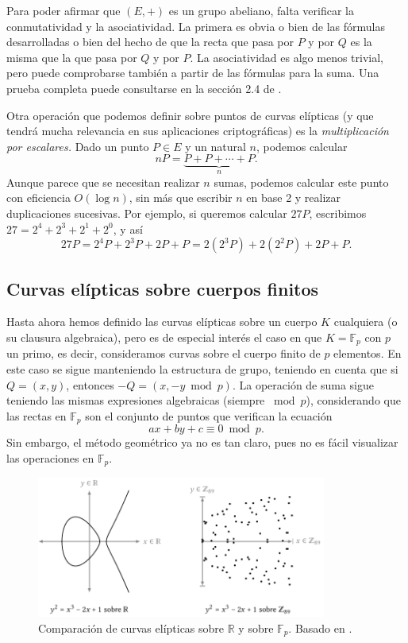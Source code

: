 \documentclass[
  a4paper,
  12pt,
  spanish,
]{scrartcl}
\begin{document}
    Para poder afirmar que $(E, +)$ es un grupo abeliano, falta verificar la conmutatividad y la asociatividad. La primera es obvia o bien de las fórmulas desarrolladas o bien del hecho de que la recta que pasa por $P$ y por $Q$ es la misma que la que pasa por $Q$ y por $P$. La asociatividad es algo menos trivial, pero puede comprobarse también a partir de las fórmulas para la suma. Una prueba completa puede consultarse en la sección 2.4 de \parencite{elliptic_washington_2008}.
    
    Otra operación que podemos definir sobre puntos de curvas elípticas (y que tendrá mucha relevancia en sus aplicaciones criptográficas) es la \textit{multiplicación por escalares.} Dado un punto $P\in E$ y un natural $n$, podemos calcular \[ nP = \underbrace{P + P + \cdots + P}_{n}.\] Aunque parece que se necesitan realizar $n$ sumas, podemos calcular este punto con eficiencia $O(\log n)$, sin más que escribir $n$ en base 2 y realizar duplicaciones sucesivas. Por ejemplo, si queremos calcular $27P$, escribimos $27 = 2^4 + 2^3 + 2^1 + 2^0$, y así \[ 27P = 2^4P + 2^3P + 2P + P = 2(2^3P) + 2(2^2P) + 2P + P.\]
    
\subsection{Curvas elípticas sobre cuerpos finitos}

Hasta ahora hemos definido las curvas elípticas sobre un cuerpo $K$ cualquiera (o su clausura algebraica), pero es de especial interés el caso en que $K=\mathbb{F}_p$ con $p$ un primo, es decir, consideramos curvas sobre el cuerpo finito de $p$ elementos. En este caso se sigue manteniendo la estructura de grupo, teniendo en cuenta que si $Q = (x,y)$, entonces $-Q = (x, -y \bmod p)$. La operación de suma sigue teniendo las mismas expresiones algebraicas (siempre $\bmod p$), considerando que las rectas en $\mathbb{F}_p$ son el conjunto de puntos que verifican la ecuación \[ ax + by + c \equiv 0 \bmod p. \] Sin embargo, el método geométrico ya no es tan claro, pues no es fácil visualizar las operaciones en $\mathbb{F}_p$.

\begin{figure}[h]
  \centering
  \includegraphics[width=0.85\textwidth]{img/cuerpos-curvas}
  \caption{Comparación de curvas elípticas sobre $\mathbb{R}$ y sobre $\mathbb{F}_p$. Basado en \parencite{eichlseder_elliptic_2016}.}
  \label{fig:cuerpos-curvas}
\end{figure}
\end{document}
